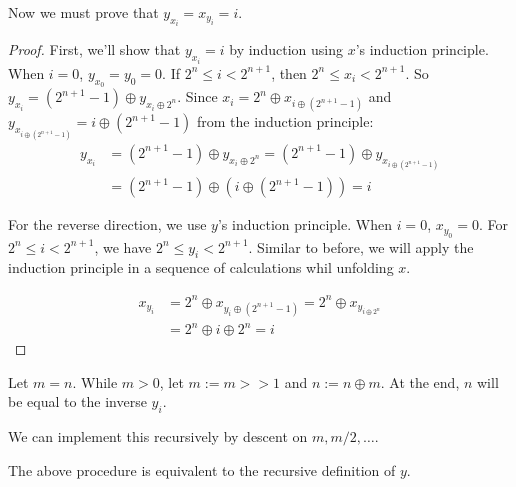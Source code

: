 \begin{theorem}
    \label{thm:recursive_inverse_is_inverse}
    \leanok
    Now we must prove that $y_{x_i} = x_{y_i} = i$.
\end{theorem}

\begin{proof}
    \leanok
    First, we'll show that $y_{x_{i}} = i$ by induction using $x$'s induction principle.
    When $i = 0$, $y_{x_0} = y_0 = 0$. If $2^n \le i < 2^{n+1}$, then $2^n \le x_i < 2^{n+1}$.
    So $y_{x_i} = (2^{n+1} - 1) \oplus y_{x_i \oplus 2^n}$. Since $x_i = 2^n \oplus x_{i \oplus (2^{n+1} - 1)}$ and $y_{x_{i \oplus (2^{n+1} - 1)}} = i \oplus (2^{n+1} - 1)$ from the induction principle:
    \begin{align*}
        y_{x_i} &= (2^{n+1} - 1) \oplus y_{x_i \oplus 2^n} = (2^{n+1} - 1) \oplus y_{x_{i \oplus (2^{n+1} - 1)}} \\
        &= (2^{n+1} - 1) \oplus (i \oplus (2^{n+1} - 1)) = i
    \end{align*}

    For the reverse direction, we use $y$'s induction principle.
    When $i = 0$, $x_{y_0} = 0$. For $2^n \le i < 2^{n+1}$, we have $2^n \le y_i < 2^{n+1}$.
    Similar to before, we will apply the induction principle in a sequence of calculations whil unfolding $x$.

    \begin{align*}
        x_{y_i} &= 2^n \oplus x_{y_i \oplus (2^{n+1} - 1)} = 2^n \oplus x_{y_{i \oplus 2^n}} \\
        &= 2^n \oplus i \oplus 2^n = i
    \end{align*}
\end{proof}

\begin{definition}
    \label{def:computable_inverse}
    \leanok
    
    Let $m = n$. While $m > 0$, let $m := m >> 1$ and $n := n \oplus m$.
    At the end, $n$ will be equal to the inverse $y_i$.

    We can implement this recursively by descent on $m, m/2, \ldots$.
\end{definition}

\begin{theorem}
    \label{thm:computable_inverse_is_equivalent}
    \leanok

    The above procedure is equivalent to the recursive definition of $y$.
\end{theorem}

